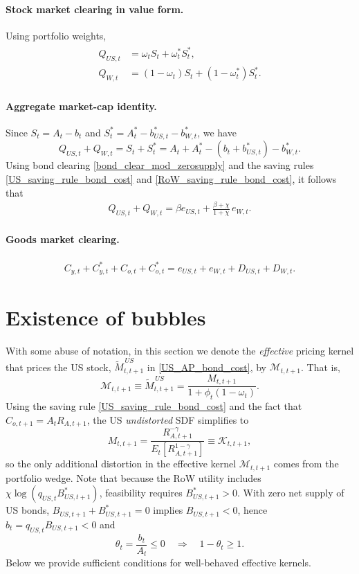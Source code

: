 \documentclass[12pt]{article}
\theoremstyle{plain}
\begin{document}
\paragraph{Stock market clearing in value form.}
Using portfolio weights,
\begin{align}\label{stock_weight_clear_mod}
\begin{split}
Q_{US,t} &= \omega_t S_t + \omega_t^* S_t^*,\\
Q_{W,t}  &= (1-\omega_t) S_t + (1-\omega_t^*) S_t^* .
\end{split}
\end{align}

\paragraph{Aggregate market-cap identity.}
Since $S_t=A_t-b_t$ and $S_t^*=A_t^*-b_{US,t}^*-b_{W,t}^*$, we have
\[
Q_{US,t}+Q_{W,t}=S_t+S_t^*=A_t+A_t^*-(b_t+b_{US,t}^*)-b_{W,t}^*.
\]
Using bond clearing \eqref{bond_clear_mod_zerosupply} and the saving rules
\eqref{US_saving_rule_bond_cost} and \eqref{RoW_saving_rule_bond_cost}, it follows that
\begin{align}\label{Qsum_identity_mod_zerosupply}
\boxed{
Q_{US,t}+Q_{W,t}
=
\beta e_{US,t}
+\frac{\beta+\chi}{1+\chi}\,e_{W,t}.
}
\end{align}

\paragraph{Goods market clearing.}
\begin{align}\label{goods_clear_mod}
C_{y,t}+C^*_{y,t}+C_{o,t}+C^*_{o,t}
=
e_{US,t}+e_{W,t}+D_{US,t}+D_{W,t}.
\end{align}



\section{Existence of bubbles}\label{sec:existence_of_bubbles}

With some abuse of notation, in this section we denote the \emph{effective} pricing kernel that prices the US stock,
$\tilde M^{\,US}_{t,t+1}$ in \eqref{US_AP_bond_cost}, by $\mathcal M_{t,t+1}$. That is,
\[
\mathcal M_{t,t+1}\equiv \tilde M^{\,US}_{t,t+1}
=\frac{M_{t,t+1}}{1+\phi_t(1-\omega_t)}.
\]
Using the saving rule \eqref{US_saving_rule_bond_cost} and the fact that $C_{o,t+1}=A_tR_{A,t+1}$, the US \emph{undistorted}
SDF simplifies to
\[
M_{t,t+1}
=\frac{R_{A,t+1}^{-\gamma}}{E_t\!\left[R_{A,t+1}^{1-\gamma}\right]}
\equiv \mathcal K_{t,t+1},
\]
so the only additional distortion in the effective kernel $\mathcal M_{t,t+1}$ comes from the portfolio wedge.
Note that because the RoW utility includes $\chi\log(q_{US,t}B^*_{US,t+1})$, feasibility requires $B^*_{US,t+1}>0$.
With zero net supply of US bonds, $B_{US,t+1}+B^*_{US,t+1}=0$ implies $B_{US,t+1}<0$, hence
$b_t=q_{US,t}B_{US,t+1}<0$ and
\begin{equation}\label{theta_nonpos}
\theta_t=\frac{b_t}{A_t}\le 0
\quad\Rightarrow\quad
1-\theta_t\ge 1 .
\end{equation}
Below we provide sufficient conditions for well-behaved effective kernels.
\end{document}
